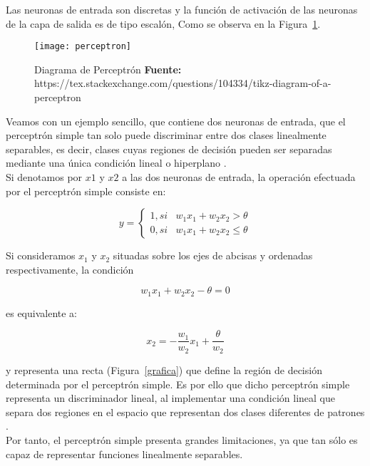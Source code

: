 \documentclass[10pt,a4paper]{article}
\begin{document}
Las neuronas de entrada son discretas y la función de activación de las neuronas de
la capa de salida es de tipo escalón, Como se observa en la Figura~\ref{perc}.\\

\begin{figure}[H]
\centering
\texttt{[image: perceptron]}
\caption{Diagrama de Perceptrón {\scriptsize \textbf{Fuente: }https://tex.stackexchange.com/questions/104334/tikz-diagram-of-a-perceptron}}
\label{perc}
\end{figure}

Veamos con un ejemplo sencillo, que contiene dos neuronas de entrada, que el perceptrón simple tan solo puede discriminar entre dos clases linealmente separables, es decir, clases cuyas regiones de decisión pueden ser separadas mediante una única condición lineal o hiperplano \cite{BIBING2017}.\\
Si denotamos por $x1$ y $x2$ a las dos neuronas de entrada, la operación efectuada por el perceptrón simple consiste en:

\begin{equation}
y = \left\{\begin{matrix}
1, si & w_1x_1+w_2x_2 > \theta\\ 
0, si & w_1x_1+w_2x_2\leqslant \theta
\end{matrix}\right.
\end{equation}

Si consideramos $x_1$ y $x_2$ situadas sobre los ejes de abcisas y ordenadas respectivamente, la condición

\begin{equation}
w_1x_1+w_2x_2 -\theta=0
\end{equation}

es equivalente a:

\begin{equation}
x_2=-\frac{w_1}{w_2} x_1 + \frac{\theta}{w_2}
\end{equation}

y representa una recta (Figura~\ref{grafica}) que define la región de decisión determinada por el perceptrón simple. Es por ello que dicho perceptrón simple representa un discriminador lineal, al implementar una condición lineal que separa dos regiones en el espacio que representan dos clases diferentes de patrones \cite{BIBING2017}.\\

Por tanto, el perceptrón simple presenta grandes limitaciones, ya que tan sólo es capaz de representar funciones linealmente separables.
\end{document}
